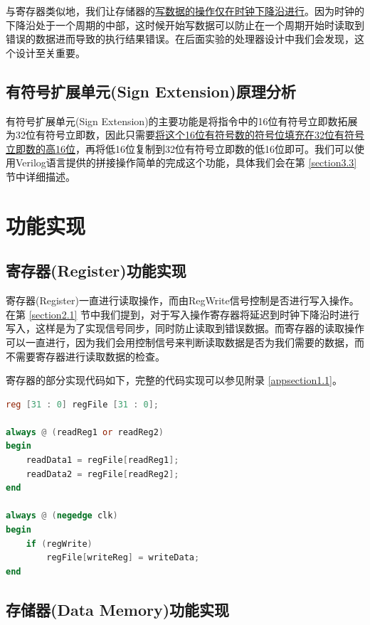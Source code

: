 \documentclass{cumcm}
\numberwithin{equation}{section}
\numberwithin{equation}{subsection}
\begin{document}
与寄存器类似地，我们让存储器的\underline{写数据的操作仅在时钟下降沿进行}。因为时钟的下降沿处于一个周期的中部，这时候开始写数据可以防止在一个周期开始时读取到错误的数据进而导致的执行结果错误。在后面实验的处理器设计中我们会发现，这个设计至关重要。

\subsection{有符号扩展单元(Sign Extension)原理分析}\label{section2.3}

有符号扩展单元(Sign Extension)的主要功能是将指令中的16位有符号立即数拓展为32位有符号立即数，因此只需要\underline{将这个16位有符号数的符号位填充在32位有符号立即数的高16位}，再将低16位复制到32位有符号立即数的低16位即可。我们可以使用Verilog语言提供的拼接操作简单的完成这个功能，具体我们会在第 \ref{section3.3} 节中详细描述。

\section{功能实现}\label{section3}

\subsection{寄存器(Register)功能实现}\label{section3.1}

寄存器(Register)一直进行读取操作，而由RegWrite信号控制是否进行写入操作。在第 \ref{section2.1} 节中我们提到，对于写入操作寄存器将延迟到时钟下降沿时进行写入，这样是为了实现信号同步，同时防止读取到错误数据。而寄存器的读取操作可以一直进行，因为我们会用控制信号来判断读取数据是否为我们需要的数据，而不需要寄存器进行读取数据的检查。

寄存器的部分实现代码如下，完整的代码实现可以参见附录 \ref{appsection1.1}。

\begin{lstlisting}[language=verilog]
reg [31 : 0] regFile [31 : 0];

always @ (readReg1 or readReg2)
begin
    readData1 = regFile[readReg1];
    readData2 = regFile[readReg2];
end
    
always @ (negedge clk)
begin
    if (regWrite)
        regFile[writeReg] = writeData;
end
\end{lstlisting}

\subsection{存储器(Data Memory)功能实现}\label{section3.2}
\end{document}
